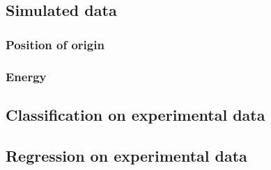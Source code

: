\subsection{Simulated data}
\subsubsection{Position of origin}

\subsubsection{Energy}


\subsection{Classification on experimental data}


\subsection{Regression on experimental data}




